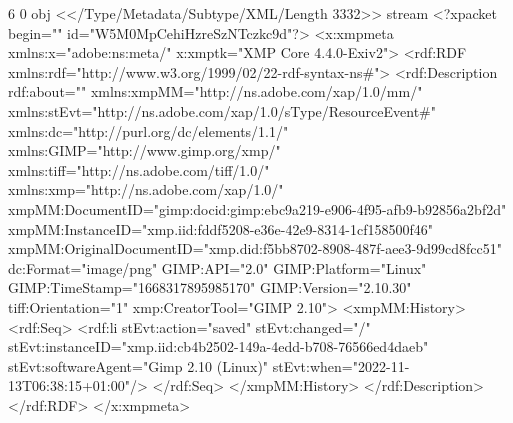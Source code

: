 6 0 obj
<</Type/Metadata/Subtype/XML/Length 3332>>
stream
<?xpacket begin="﻿" id="W5M0MpCehiHzreSzNTczkc9d"?>
<x:xmpmeta xmlns:x="adobe:ns:meta/" x:xmptk="XMP Core 4.4.0-Exiv2">
 <rdf:RDF xmlns:rdf="http://www.w3.org/1999/02/22-rdf-syntax-ns#">
  <rdf:Description rdf:about=""
    xmlns:xmpMM="http://ns.adobe.com/xap/1.0/mm/"
    xmlns:stEvt="http://ns.adobe.com/xap/1.0/sType/ResourceEvent#"
    xmlns:dc="http://purl.org/dc/elements/1.1/"
    xmlns:GIMP="http://www.gimp.org/xmp/"
    xmlns:tiff="http://ns.adobe.com/tiff/1.0/"
    xmlns:xmp="http://ns.adobe.com/xap/1.0/"
   xmpMM:DocumentID="gimp:docid:gimp:ebc9a219-e906-4f95-afb9-b92856a2bf2d"
   xmpMM:InstanceID="xmp.iid:fddf5208-e36e-42e9-8314-1cf158500f46"
   xmpMM:OriginalDocumentID="xmp.did:f5bb8702-8908-487f-aee3-9d99cd8fcc51"
   dc:Format="image/png"
   GIMP:API="2.0"
   GIMP:Platform="Linux"
   GIMP:TimeStamp="1668317895985170"
   GIMP:Version="2.10.30"
   tiff:Orientation="1"
   xmp:CreatorTool="GIMP 2.10">
   <xmpMM:History>
    <rdf:Seq>
     <rdf:li
      stEvt:action="saved"
      stEvt:changed="/"
      stEvt:instanceID="xmp.iid:cb4b2502-149a-4edd-b708-76566ed4daeb"
      stEvt:softwareAgent="Gimp 2.10 (Linux)"
      stEvt:when="2022-11-13T06:38:15+01:00"/>
    </rdf:Seq>
   </xmpMM:History>
  </rdf:Description>
 </rdf:RDF>
</x:xmpmeta>
                                                                                                    
                                                                                                    
                                                                                                    
                                                                                                    
                                                                                                    
                                                                                                    
                                                                                                    
                                                                                                    
                                                                                                    
                                                                                                    
                                                                                                    
